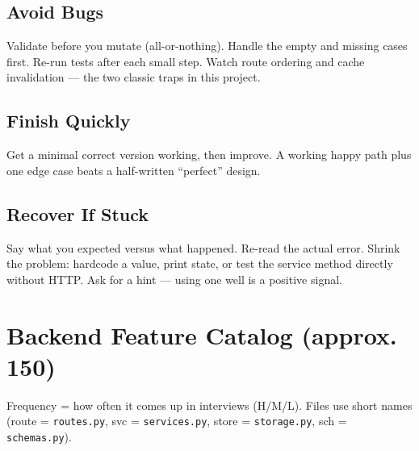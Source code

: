 \documentclass[11pt,a4paper]{report}
\begin{document}
\section{Avoid Bugs}
Validate before you mutate (all-or-nothing). Handle the empty and missing cases
first. Re-run tests after each small step. Watch route ordering and cache
invalidation --- the two classic traps in this project.

\section{Finish Quickly}
Get a minimal correct version working, then improve. A working happy path plus one
edge case beats a half-written ``perfect'' design.

\section{Recover If Stuck}
Say what you expected versus what happened. Re-read the actual error. Shrink the
problem: hardcode a value, print state, or test the service method directly
without HTTP. Ask for a hint --- using one well is a positive signal.

\chapter{Backend Feature Catalog (approx. 150)}

Frequency = how often it comes up in interviews (H/M/L). Files use short names
(route = \texttt{routes.py}, svc = \texttt{services.py}, store =
\texttt{storage.py}, sch = \texttt{schemas.py}).
\end{document}
